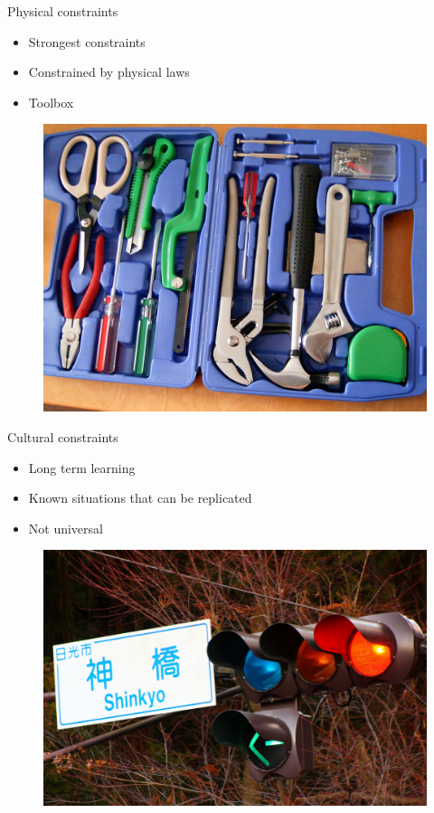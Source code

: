 \documentclass{beamer}
\begin{document}
\begin{frame}{Physical constraints}
    		 \begin{itemize}
    		 \item Strongest constraints
    		 \item Constrained by physical laws
    		 \item Toolbox
    		 \end{itemize}
             \begin{figure}
             \includegraphics[scale=0.1]{toolbox.jpg}
             \end{figure}

\end{frame}

\begin{frame}{Cultural constraints}
    \begin{itemize}
		\item Long term learning
    		\item Known situations that can be replicated
    		\item Not universal
    \end{itemize}
    \begin{figure}[ht]
    \includegraphics[scale=0.1]{japan-traffic-light.jpg}
    \end{figure}
\end{frame}
\end{document}
